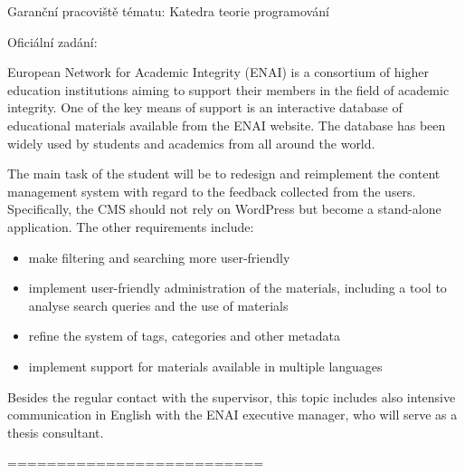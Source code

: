\documentclass[
  digital,     %
  oneside,     %
  nosansbold,  %
  colorbold, %
  lof,         %
  lot,         %
]{fithesis4}
\begin{document}
Garanční pracoviště tématu: Katedra teorie programování

Oficiální zadání:

European Network for Academic Integrity (ENAI) is a consortium of higher education institutions
aiming to support their members in the field of academic integrity. One of the key means of
support is an interactive database of educational materials available from the ENAI website.
The database has been widely used by students and academics from all around the world.

The main task of the student will be to redesign and reimplement the content management
system with regard to the feedback collected from the users. Specifically, the CMS should
not rely on WordPress but become a stand-alone application. The other requirements include:

\begin{itemize}
    \item make filtering and searching more user-friendly
    \item implement user-friendly administration of the materials, including a tool to
    analyse search queries and the use of materials
    \item refine the system of tags, categories and other metadata
    \item implement support for materials available in multiple languages
\end{itemize}

Besides the regular contact with the supervisor, this topic includes also intensive
communication in English with the ENAI executive manager, who will serve as a thesis
consultant.

==========================

\printbibliography[heading=bibintoc] %


\end{document}

